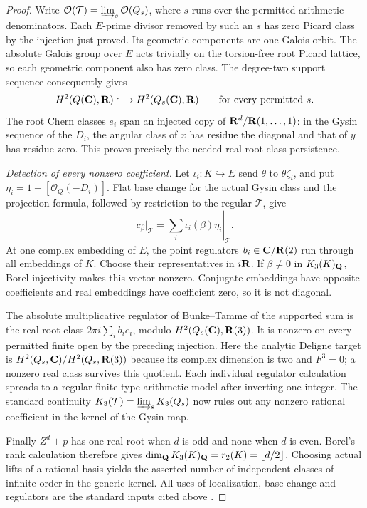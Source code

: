 \begin{proof}
Write $\mathcal O(\mathcal T)=\varinjlim_s\mathcal O(Q_s)$,
where $s$ runs over the permitted arithmetic denominators.
Each $E$-prime divisor removed by such an $s$ has zero Picard
class by the injection just proved. Its geometric components
are one Galois orbit. The absolute Galois group over $E$ acts trivially on the torsion-free
root Picard lattice, so each geometric component also has zero
class. The degree-two support sequence consequently gives
\[
 H^2(Q(\C),\R)\lhook\joinrel\longrightarrow
 H^2(Q_s(\C),\R)\qquad\text{for every permitted }s.
\]
The root Chern classes $e_i$ span an injected copy of
$\mathbf R^d/\mathbf R(1,\ldots,1)$: in the Gysin sequence of the $D_i$,
the angular class of $x$ has residue the diagonal and that of
$y$ has residue zero. This proves precisely the needed real
root-class persistence.

\emph{Detection of every nonzero coefficient.}
Let $\iota_i:K\hookrightarrow E$ send $\theta$ to
$\theta\zeta_i$, and put $\eta_i=1-[\mathcal O_Q(-D_i)]$.
Flat base change for the actual Gysin class and the projection
formula, followed by restriction to the regular $\mathcal T$,
give
\[
 c_\beta|_{\mathcal T}
    =\left.\sum_i\iota_i(\beta)\eta_i\right|_{\mathcal T}.
\]
At one complex embedding of $E$, the point regulators
$b_i\in\mathbf C/\mathbf R(2)$ run through all embeddings of $K$.
Choose their representatives in $i\mathbf R$. If $\beta\ne0$ in
$K_3(K)_{\mathbf Q}$, Borel injectivity \cite[Section~6]{BunkeTamme}
makes this vector nonzero.
Conjugate embeddings have opposite coefficients and real
embeddings have coefficient zero, so it is not diagonal.

The absolute multiplicative regulator of Bunke--Tamme
\cite[Theorem~2.31]{BunkeTamme} of the supported sum
is the real root class $2\pi i\sum_i b_i e_i$, modulo
$H^2(Q_s(\mathbf C),\mathbf R(3))$. It is nonzero on every permitted finite
open by the preceding injection. Here the analytic Deligne
target is $H^2(Q_s,\mathbf C)/H^2(Q_s,\mathbf R(3))$ because its complex
dimension is two and $F^3=0$; a nonzero real class survives this
quotient. Each individual regulator calculation spreads to a
regular finite type arithmetic model after inverting one
integer. The standard continuity
$K_3(\mathcal T)=\varinjlim_s K_3(Q_s)$ now rules out any
nonzero rational coefficient in the kernel of the Gysin map.

Finally $Z^d+p$ has one real root when $d$ is odd and none
when $d$ is even. Borel's rank calculation
\cite[Proposition~12.2]{Borel} therefore gives
$\dim_{\mathbf Q}K_3(K)_{\mathbf Q}=r_2(K)=\lfloor d/2\rfloor$.
Choosing actual lifts of a rational basis yields the asserted
number of independent classes of infinite order in the generic kernel.
All uses of localization, base change and regulators are the
standard inputs cited above \cite{Quillen,QuillenFinite,Borel,BunkeTamme,Weibel}.
\end{proof}

